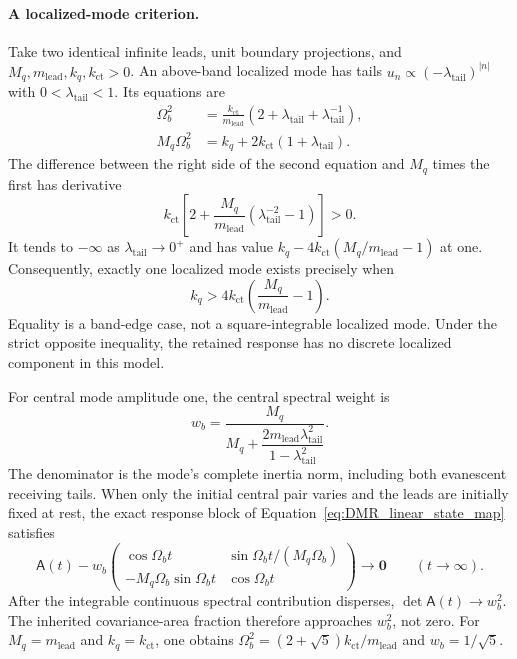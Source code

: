 \paragraph{A localized-mode criterion.}
Take two identical infinite leads, unit boundary projections, and $M_q,m_{\mathrm{lead}},k_q,k_{\mathrm{ct}}>0$. An above-band localized mode has tails $u_n\propto(-\lambda_{\mathrm{tail}})^{|n|}$ with $0<\lambda_{\mathrm{tail}}<1$. Its equations are
\begin{align}
 \Omega_b^2&=\frac{k_{\mathrm{ct}}}{m_{\mathrm{lead}}}
 (2+\lambda_{\mathrm{tail}}+\lambda_{\mathrm{tail}}^{-1}),\\
 M_q\Omega_b^2&=k_q+2k_{\mathrm{ct}}(1+\lambda_{\mathrm{tail}}).
\end{align}
The difference between the right side of the second equation and $M_q$ times the first has derivative
\begin{equation}
 k_{\mathrm{ct}}\left[
 2+\frac{M_q}{m_{\mathrm{lead}}}(\lambda_{\mathrm{tail}}^{-2}-1)
 \right]>0.
\end{equation}
It tends to $-\infty$ as $\lambda_{\mathrm{tail}}\to0^+$ and has value $k_q-4k_{\mathrm{ct}}(M_q/m_{\mathrm{lead}}-1)$ at one. Consequently, exactly one localized mode exists precisely when
\begin{equation}
 \boxed{
 k_q>4k_{\mathrm{ct}}\left(\frac{M_q}{m_{\mathrm{lead}}}-1\right)
 }.
\label{eq:DMR_bound_mode_criterion}
\end{equation}
Equality is a band-edge case, not a square-integrable localized mode. Under the strict opposite inequality, the retained response has no discrete localized component in this model.

For central mode amplitude one, the central spectral weight is
\begin{equation}
 w_b=\frac{M_q}{
 M_q+\dfrac{2m_{\mathrm{lead}}\lambda_{\mathrm{tail}}^2}
 {1-\lambda_{\mathrm{tail}}^2}}.
\label{eq:DMR_bound_weight}
\end{equation}
The denominator is the mode's complete inertia norm, including both evanescent receiving tails. When only the initial central pair varies and the leads are initially fixed at rest, the exact response block of Equation~\eqref{eq:DMR_linear_state_map} satisfies
\begin{equation}
 \mathsf A(t)-w_b
 \begin{pmatrix}
 \cos\Omega_bt&\sin\Omega_bt/(M_q\Omega_b)\\
 -M_q\Omega_b\sin\Omega_bt&\cos\Omega_bt
 \end{pmatrix}\longrightarrow\mathbf 0
 \qquad(t\to\infty).
\end{equation}
After the integrable continuous spectral contribution disperses, $\det\mathsf A(t)\to w_b^2$. The inherited covariance-area fraction therefore approaches $w_b^2$, not zero. For $M_q=m_{\mathrm{lead}}$ and $k_q=k_{\mathrm{ct}}$, one obtains $\Omega_b^2=(2+\sqrt5)k_{\mathrm{ct}}/m_{\mathrm{lead}}$ and $w_b=1/\sqrt5$.

